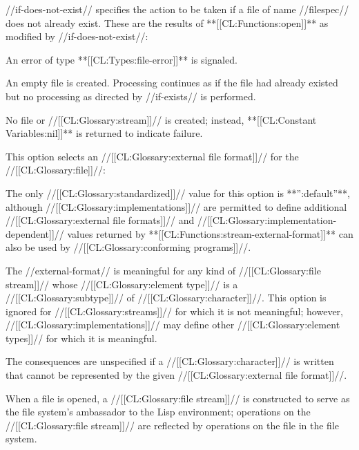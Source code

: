 \endlist


//if-does-not-exist// specifies the action to be taken if a file of name //filespec// does not already exist. These are the results of **[[CL:Functions:open]]** as modified by //if-does-not-exist//:

\beginlist


An error of type **[[CL:Types:file-error]]** is signaled.


An empty file is created. Processing continues as if the file had already existed but no processing as directed by //if-exists// is performed.


No file or //[[CL:Glossary:stream]]// is created; instead, **[[CL:Constant Variables:nil]]** is returned to indicate failure.

\endlist


This option selects an //[[CL:Glossary:external file format]]// for the //[[CL:Glossary:file]]//:

The only //[[CL:Glossary:standardized]]// value for this option is **'':default''**, although //[[CL:Glossary:implementations]]// are permitted to define additional //[[CL:Glossary:external file formats]]// and //[[CL:Glossary:implementation-dependent]]// values returned by **[[CL:Functions:stream-external-format]]** can also be used by //[[CL:Glossary:conforming programs]]//.


The //external-format// is meaningful for any kind of //[[CL:Glossary:file stream]]// whose //[[CL:Glossary:element type]]// is a //[[CL:Glossary:subtype]]// of //[[CL:Glossary:character]]//. This option is ignored for //[[CL:Glossary:streams]]// for which it is not meaningful; however, //[[CL:Glossary:implementations]]// may define other //[[CL:Glossary:element types]]// for which it is meaningful.

The consequences are unspecified if a //[[CL:Glossary:character]]// is written that cannot be represented by the given //[[CL:Glossary:external file format]]//.

\endlist

When a file is opened, a //[[CL:Glossary:file stream]]// is constructed to serve as the file system's ambassador to the Lisp environment; operations on the //[[CL:Glossary:file stream]]// are reflected by operations on the file in the file system.


